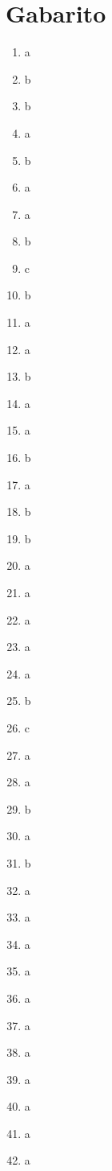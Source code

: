 \documentclass[12pt,a4paper]{article}
\begin{document}
\newpage

\section*{Gabarito}

\begin{multicols}{2}
\begin{enumerate}[label=\textbf{Q\arabic*.}]
    \item a
    \item b
    \item b
    \item a
    \item b
    \item a
    \item a
    \item b
    \item c
    \item b
    \item a
    \item a
    \item b
    \item a
    \item a
    \item b
    \item a
    \item b
    \item b
    \item a
    \item a
    \item a
    \item a
    \item a
    \item b
    \item c
    \item a
    \item a
    \item b
    \item a
    \item b
    \item a
    \item a
    \item a
    \item a
    \item a
    \item a
    \item a
    \item a
    \item a
    \item a
    \item a

\end{enumerate}
\end{multicols}
\end{document}
